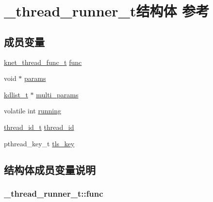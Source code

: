 \hypertarget{a00036}{}\section{\+\_\+thread\+\_\+runner\+\_\+t结构体 参考}
\label{a00036}
\subsection*{成员变量}
\begin{DoxyCompactItemize}
\item 
\hyperlink{a00051_a8741dac4a9f8d97603eb3a30a3473b13_a8741dac4a9f8d97603eb3a30a3473b13}{knet\+\_\+thread\+\_\+func\+\_\+t} \hyperlink{a00036_a1f56d29a55490e9ae7c673e07317de36_a1f56d29a55490e9ae7c673e07317de36}{func}
\item 
void $\ast$ \hyperlink{a00036_aab08f4e0fa5f6ffe16fcd3c055666c9c_aab08f4e0fa5f6ffe16fcd3c055666c9c}{params}
\item 
\hyperlink{a00051_ae098586334a621a23cef7cb17590b618_ae098586334a621a23cef7cb17590b618}{kdlist\+\_\+t} $\ast$ \hyperlink{a00036_af21668f1d89dff5046d431399d2cf7c6_af21668f1d89dff5046d431399d2cf7c6}{multi\+\_\+params}
\item 
volatile int \hyperlink{a00036_a158d37a73657b2df73e3a2dd383808f8_a158d37a73657b2df73e3a2dd383808f8}{running}
\item 
\hyperlink{a00051_ad0ada5642d10ce71bdd90816182f9b79_ad0ada5642d10ce71bdd90816182f9b79}{thread\+\_\+id\+\_\+t} \hyperlink{a00036_ab632944b59861e33a9473347b0afdc00_ab632944b59861e33a9473347b0afdc00}{thread\+\_\+id}
\item 
pthread\+\_\+key\+\_\+t \hyperlink{a00036_ad7461a4eef9b83e07f0acd4f26923744_ad7461a4eef9b83e07f0acd4f26923744}{tls\+\_\+key}
\end{DoxyCompactItemize}


\subsection{结构体成员变量说明}
\hypertarget{a00036_a1f56d29a55490e9ae7c673e07317de36_a1f56d29a55490e9ae7c673e07317de36}{}
\subsubsection[{func}]{ \+\_\+thread\+\_\+runner\+\_\+t\+::func}\label{a00036_a1f56d29a55490e9ae7c673e07317de36_a1f56d29a55490e9ae7c673e07317de36}
\hypertarget{a00036_af21668f1d89dff5046d431399d2cf7c6_af21668f1d89dff5046d431399d2cf7c6}{}
